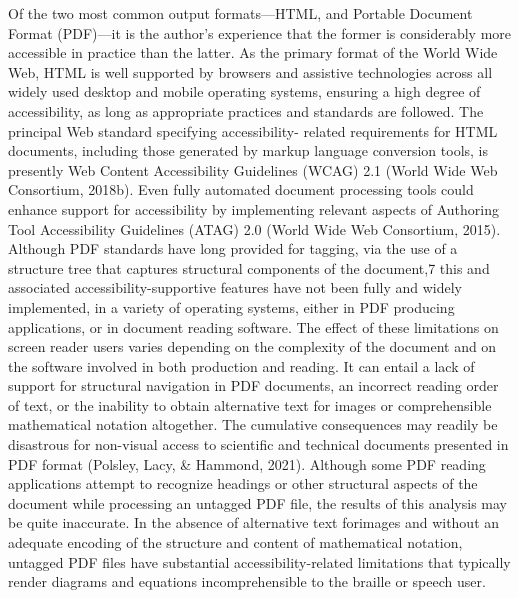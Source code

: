 \documentclass[11pt]{sig-alternate}
\begin{document}
\begin{large}
Of the two most common output formats—HTML, and Portable Document Format (PDF)—it is the author’s experience that the former is considerably more accessible in practice than the latter. As the primary format of the World Wide Web, HTML is well supported by browsers and assistive technologies across all widely used desktop and mobile operating systems, ensuring a high degree of accessibility, as long as appropriate practices and standards are followed. The principal Web standard specifying accessibility- related requirements for HTML documents, including those generated by markup language conversion tools, is presently Web Content Accessibility Guidelines (WCAG) 2.1 (World Wide Web Consortium, 2018b). Even fully automated document processing tools could enhance support for accessibility by implementing relevant aspects of Authoring Tool Accessibility Guidelines (ATAG) 2.0 (World Wide Web Consortium, 2015). Although PDF standards have long provided for tagging, via the use of a structure tree that captures structural components of the document,7 this and associated accessibility-supportive features have not been fully and widely implemented, in a variety of operating systems, either in PDF producing applications, or in document reading software. The effect of these limitations on screen reader users varies depending on the complexity of the document and on the software involved in both production and reading. It can entail a lack of support for structural navigation in PDF documents, an incorrect reading order of text, or the inability to obtain alternative text for images or comprehensible mathematical notation altogether. The cumulative consequences may readily be disastrous for non-visual access to scientific and technical documents presented in PDF format (Polsley, Lacy, \& Hammond, 2021). Although some PDF reading applications attempt to recognize headings or other structural aspects of the document while processing an untagged PDF file, the results of this analysis may be quite inaccurate. In the absence of alternative text forimages and without an adequate encoding of the structure and content of mathematical notation, untagged PDF files have substantial accessibility-related limitations that typically render diagrams and equations incomprehensible to the braille or speech user.


\end{large}
\end{document}
